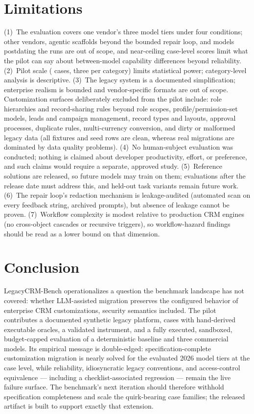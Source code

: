 \documentclass{ieeetj}
\begin{document}
\section{Limitations}
\label{sec:limitations}
(1)~The evaluation covers one vendor's three model tiers under four conditions; other
vendors, agentic scaffolds beyond the bounded repair loop, and models postdating the runs are
out of scope, and near-ceiling case-level scores limit what the pilot can say about
between-model capability differences beyond reliability. (2)~Pilot scale (\NumCases{} cases, three per category) limits statistical power; category-level
analysis is descriptive. (3)~The legacy system is a documented simplification; enterprise
realism is bounded and vendor-specific formats are out of scope. Customization surfaces
deliberately excluded from the pilot include: role hierarchies and record-sharing rules beyond
role scopes, profile/permission-set models, leads and campaign management, record types and
layouts, approval processes, duplicate rules, multi-currency conversion, and dirty or
malformed legacy data (all fixtures and seed rows are clean, whereas real migrations are
dominated by data quality problems). (4)~No human-subject evaluation was conducted; nothing
is claimed about developer productivity, effort, or preference, and such claims would require
a separate, approved study. (5)~Reference solutions are released, so future models may train
on them; evaluations after the release date must address this, and held-out task variants
remain future work. (6)~The repair loop's redaction mechanism is leakage-audited (automated scan on every
feedback string, archived prompts), but absence of leakage cannot be proven. (7)~Workflow complexity is modest
relative to production CRM engines (no cross-object cascades or recursive triggers), so
workflow-hazard findings should be read as a lower bound on that dimension.

\section{Conclusion}
\label{sec:conclusion}
LegacyCRM-Bench operationalizes a question the benchmark landscape has not covered: whether
LLM-assisted migration preserves the configured behavior of enterprise CRM customizations,
security semantics included. The pilot contributes a documented synthetic legacy platform,
\NumCases{} cases with hand-derived executable oracles, a validated instrument, and a fully
executed, sandboxed, budget-capped evaluation of a deterministic baseline and three
commercial models. Its empirical message is double-edged: specification-complete
customization migration is nearly solved for the evaluated 2026 model tiers at the case
level, while
reliability, idiosyncratic legacy conventions, and access-control equivalence --- including a
checklist-associated regression --- remain the live failure surface. The benchmark's next
iteration should therefore withhold specification completeness and scale the quirk-bearing
case families; the released artifact is built to support exactly that extension.
\end{document}
